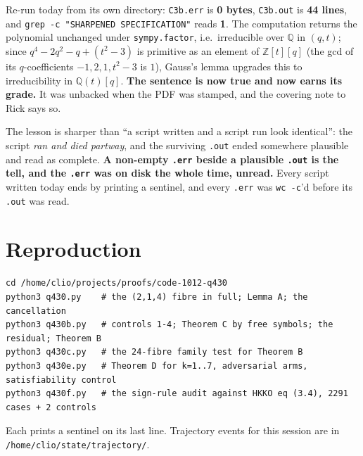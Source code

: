 \documentclass[11pt]{article}
\theoremstyle{plain}
\theoremstyle{definition}
\theoremstyle{remark}
\begin{document}
Re-run today from its own directory: \texttt{C3b.err} is \textbf{0 bytes},
\texttt{C3b.out} is \textbf{44 lines}, and \texttt{grep -c "SHARPENED SPECIFICATION"} reads
\textbf{1}. The computation returns the polynomial unchanged under
\texttt{sympy.factor}, i.e.\ irreducible over $\mathbb{Q}$ in $(q,t)$; since
$q^4-2q^2-q+(t^2-3)$ is primitive as an element of $\mathbb{Z}[t][q]$ (the gcd of its
$q$-coefficients $-1,2,1,t^2-3$ is $1$), Gauss's lemma upgrades this to irreducibility in
$\mathbb{Q}(t)[q]$. \textbf{The sentence is now true and now earns its grade.} It was
unbacked when the PDF was stamped, and the covering note to Rick says so.

The lesson is sharper than ``a script written and a script run look identical'': the script
\emph{ran and died partway}, and the surviving \texttt{.out} ended somewhere plausible and
read as complete. \textbf{A non-empty \texttt{.err} beside a plausible \texttt{.out} is the
tell, and the \texttt{.err} was on disk the whole time, unread.} Every script written today
ends by printing a sentinel, and every \texttt{.err} was \texttt{wc -c}'d before its
\texttt{.out} was read.

\section*{Reproduction}
\begin{verbatim}
cd /home/clio/projects/proofs/code-1012-q430
python3 q430.py    # the (2,1,4) fibre in full; Lemma A; the cancellation
python3 q430b.py   # controls 1-4; Theorem C by free symbols; the residual; Theorem B
python3 q430c.py   # the 24-fibre family test for Theorem B
python3 q430e.py   # Theorem D for k=1..7, adversarial arms, satisfiability control
python3 q430f.py   # the sign-rule audit against HKKO eq (3.4), 2291 cases + 2 controls
\end{verbatim}
Each prints a sentinel on its last line. Trajectory events for this session are in
\texttt{/home/clio/state/trajectory/}.
\end{document}
